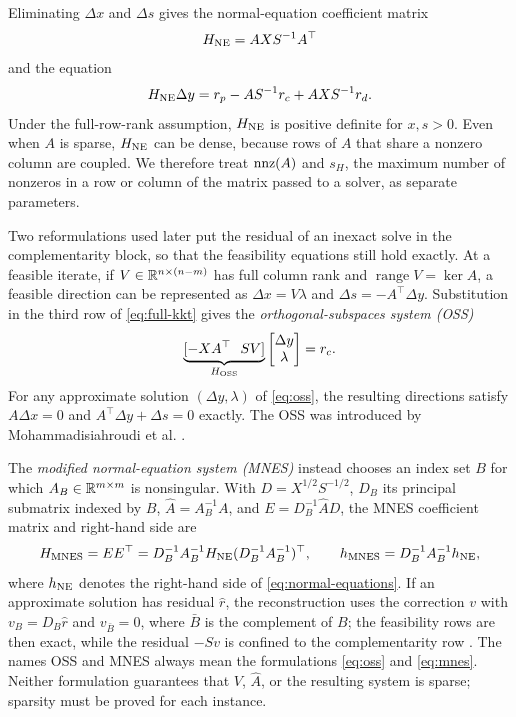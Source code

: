 Eliminating $\Delta x$ and $\Delta s$ gives the normal-equation coefficient
matrix
\begin{equation}
 H_{\rm NE}=AXS^{-1}A^\top
 \label{eq:normal-matrix}
\end{equation}
and the equation
\begin{equation}
 H_{\rm NE}\Delta y
 =r_p-AS^{-1}r_c+AXS^{-1}r_d.
 \label{eq:normal-equations}
\end{equation}
Under the full-row-rank assumption, $H_{\rm NE}$ is positive definite for
$x,s>0$.  Even when $A$ is sparse, $H_{\rm NE}$ can be dense, because rows of
$A$ that share a nonzero column are coupled.  We therefore treat $\operatorname{nnz}(A)$ and
$s_H$, the maximum number of nonzeros in a row or column of the matrix passed
to a solver, as separate parameters.

Two reformulations used later put the residual of an inexact solve in the
complementarity block, so that the feasibility equations still hold exactly.  At a feasible iterate, if
$V\in\mathbb{R}^{n\times(n-m)}$ has full column rank
and $\operatorname{range}V=\ker A$, a feasible direction can be represented as
$\Delta x=V\lambda$ and $\Delta s=-A^\top\Delta y$.  Substitution in the third
row of \eqref{eq:full-kkt} gives the \emph{orthogonal-subspaces system (OSS)}
\begin{equation}
 \underbrace{[-XA^\top\ \ SV]}_{H_{\rm OSS}}
 \begin{bmatrix}\Delta y\\\lambda\end{bmatrix}=r_c.
 \label{eq:oss}
\end{equation}
For any approximate solution $(\Delta y,\lambda)$ of \eqref{eq:oss}, the
resulting directions satisfy
$A\Delta x=0$ and $A^\top\Delta y+\Delta s=0$ exactly.  The OSS was
introduced by Mohammadisiahroudi et al.
\cite{mohammadisiahroudi2025-inexact-feasible-interior-point-method}.

The \emph{modified normal-equation system (MNES)} instead chooses an index
set $B$ for which $A_B\in\mathbb{R}^{m\times m}$ is nonsingular.  With
$D=X^{1/2}S^{-1/2}$, $D_B$ its principal submatrix indexed by $B$,
$\widehat A=A_B^{-1}A$, and $E=D_B^{-1}\widehat A D$, the MNES coefficient
matrix and right-hand side are
\begin{equation}
 H_{\rm MNES}=EE^\top
 =D_B^{-1}A_B^{-1}H_{\rm NE}(D_B^{-1}A_B^{-1})^\top,
 \qquad h_{\rm MNES}=D_B^{-1}A_B^{-1}h_{\rm NE},
 \label{eq:mnes}
\end{equation}
where $h_{\rm NE}$ denotes the right-hand side of
\eqref{eq:normal-equations}.  If an approximate solution has residual
$\widehat r$, the reconstruction uses the correction $v$ with
$v_B=D_B\widehat r$ and $v_{\bar B}=0$, where $\bar B$ is the complement of
$B$; the feasibility rows are then exact, while the residual $-Sv$ is confined to the complementarity row
\cite{mohammadisiahroudi2024-efficient-use-quantum-linear-system}.  The names
OSS and MNES always mean the formulations \eqref{eq:oss} and
\eqref{eq:mnes}.  Neither formulation guarantees that $V$, $\widehat A$, or
the resulting system is sparse; sparsity must be proved for each instance.

